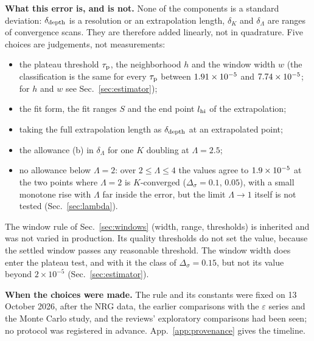 \documentclass[10pt,a4paper]{article}
\newcommand{\Ds}{\Delta_\sigma}
\newcommand{\DE}{\Delta_E}
\newcommand{\dd}{\delta_{\rm depth}}
\newcommand{\dK}{\delta_K}
\newcommand{\dL}{\delta_\Lambda}
\newcommand{\dtot}{\delta_{\rm tot}}
\newcommand{\nq}{n_q}
\begin{document}
\textbf{What this error is, and is not.} None of the components is a standard deviation: $\dd$ is a resolution or an extrapolation
length, $\dK$ and $\dL$ are ranges of convergence scans. They are therefore added linearly, not in quadrature. Five choices are
judgements, not measurements:
\begin{itemize}
\item the plateau threshold $\tau_{\rm p}$, the neighborhood $h$ and the window width $w$ (the classification is the same for every
  $\tau_{\rm p}$ between $1.91\times10^{-5}$ and $7.74\times10^{-5}$; for $h$ and $w$ see Sec.~\ref{sec:estimator});
\item the fit form, the fit ranges $S$ and the end point $l_{\rm hi}$ of the extrapolation;
\item taking the full extrapolation length as $\dd$ at an extrapolated point;
\item the allowance (b) in $\dL$ for one $K$ doubling at $\Lambda=2.5$;
\item no allowance below $\Lambda=2$: over $2\le\Lambda\le4$ the values agree to $1.9\times10^{-5}$ at the two points where $\Lambda=2$
  is $K$-converged ($\Ds=0.1$, $0.05$), with a small monotone rise with $\Lambda$ far inside the error, but the limit $\Lambda\to1$
  itself is not tested (Sec.~\ref{sec:lambda}).
\end{itemize}
The window rule of Sec.~\ref{sec:windows} (width, range, thresholds) is inherited and was not varied in production. Its quality
thresholds do not set the value, because the settled window passes any reasonable threshold. The window width does enter the plateau
test, and with it the class of $\Ds=0.15$, but not its value beyond $2\times10^{-5}$ (Sec.~\ref{sec:estimator}).

\textbf{When the choices were made.} The rule and its constants were fixed on 13 October 2026, after the NRG data, the earlier
comparisons with the $\varepsilon$ series and the Monte Carlo study, and the reviews' exploratory comparisons had been seen; no
protocol was registered in advance. App.~\ref{app:provenance} gives the timeline.

\begin{table}[ht]\centering\footnotesize\setlength{\tabcolsep}{4pt}
\caption{Error budget. Columns: estimator (plateau, extrapolated, or settled for the points not converged in chain depth); $\DE$ to six
decimals; the chain-depth error $\dd$, the $K$/$n_b$ spread $\dK$, the discretization error $\dL$ and their linear sum $\dtot$, in
units of $10^{-4}$; the number $\nq$ of quality windows of the central item; the late fit of Sec.~\ref{sec:crosscheck} minus $\DE$
(cross-check, not adopted; shown for the final points). n.c.: not converged in chain depth.}\label{tab:budget}

\end{table}
\end{document}
